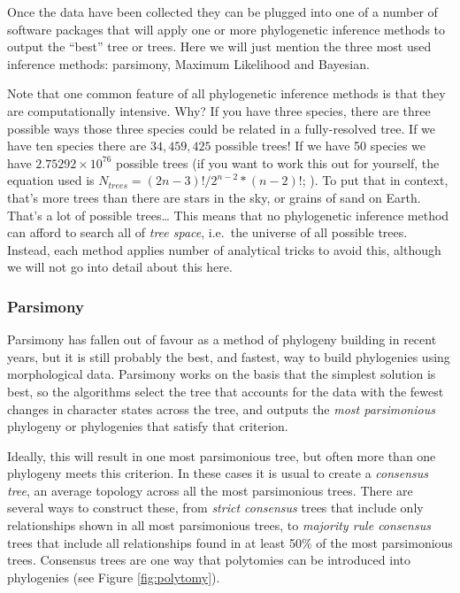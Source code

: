 \documentclass[]{book}
\begin{document}
Once the data have been collected they can be plugged into one of a
number of software packages that will apply one or more phylogenetic
inference methods to output the ``best'' tree or trees. Here we will
just mention the three most used inference methods: parsimony, Maximum
Likelihood and Bayesian.

Note that one common feature of all phylogenetic inference methods is
that they are computationally intensive. Why? If you have three species,
there are three possible ways those three species could be related in a
fully-resolved tree. If we have ten species there are \(34,459,425\)
possible trees! If we have 50 species we have \(2.75292 × 10^{76}\)
possible trees (if you want to work this out for yourself, the equation
used is \(N_{trees} = (2n-3)!/2^{n-2} * (n-2)!\);
\citep{felsenstein2004inferring}). To put that in context, that's more
trees than there are stars in the sky, or grains of sand on Earth.
That's a lot of possible trees\ldots{} This means that no phylogenetic
inference method can afford to search all of \emph{tree space}, i.e.~the
universe of all possible trees. Instead, each method applies number of
analytical tricks to avoid this, although we will not go into detail
about this here.

\subsubsection{Parsimony}\label{parsimony}

Parsimony has fallen out of favour as a method of phylogeny building in
recent years, but it is still probably the best, and fastest, way to
build phylogenies using morphological data. Parsimony works on the basis
that the simplest solution is best, so the algorithms select the tree
that accounts for the data with the fewest changes in character states
across the tree, and outputs the \emph{most parsimonious} phylogeny or
phylogenies that satisfy that criterion.

Ideally, this will result in one most parsimonious tree, but often more
than one phylogeny meets this criterion. In these cases it is usual to
create a \emph{consensus tree}, an average topology across all the most
parsimonious trees. There are several ways to construct these, from
\emph{strict consensus} trees that include only relationships shown in
all most parsimonious trees, to \emph{majority rule consensus} trees
that include all relationships found in at least 50\% of the most
parsimonious trees. Consensus trees are one way that polytomies can be
introduced into phylogenies (see Figure \ref{fig:polytomy}).
\end{document}

